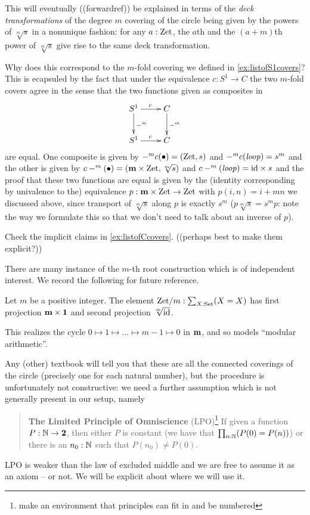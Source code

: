 \begin{example}
This will eventually ((forwardref)) be explained in terms of the \emph{deck transformations} of the degree $m$ covering of the circle being given by the powers of $\sqrt[m]s$ in a nonunique fashion: for any $a:\mathrm{Zet}$, the $a$th and the $(a+m)$th power of $\sqrt[m]s$ give rise to the same deck transformation.


Why does this correspond to the $m$-fold covering we defined in \cref{ex:listofS1covers}?  This is ecapsuled by the fact that under the equivalence $c:S^1\to C$ the two $m$-fold covers agree in the sense that the two functions given as composites in
$$\xymatrix{S^1\ar[r]^c\ar[d]^{-^m}&C\ar[d]^{-^m}\\S^1\ar[r]^c&C}$$ are equal.  One composite is given by $-^mc(\bullet)=(\mathrm{Zet},s)$ and $-^mc(\mathit{loop})=s^m$ and the other is given by $c-^m(\bullet)=(\mathbf{m}\times\mathrm{Zet},\sqrt[m]s)$ and $c-^m(\mathit{loop})=\mathord{\mathrm{id}}\times s$ and the proof that these two functions are equal is given by the (identity corresponding by univalence to the) equivalence  $p:\mathbf{m}\times \mathrm{Zet}\to\mathrm{Zet}$ with $p(i,n)=i+mn$ we discussed above, since transport of $\sqrt[m]s$ along $p$ is exactly $s^m$ (\ie $p\sqrt[m]s=s^mp$: note the way we formulate this so that we don't need to talk about an inverse of $p$).
\end{example}
\begin{xca}
  Check the implicit claims in \cref{ex:listofCcovers}.  ((perhaps best to make them explicit?))
\end{xca}
There are many instance of the $m$-th root construction which is of independent interest.  We record the following for future reference.
\begin{definition}
  \label{def:Zetmodm}
  Let $m$ be a positive integer.
  The element $\mathrm{Zet}/m:\sum_{X:\mathord{\mathrm{Set}}}(X=X)$ has first projection $\mathbf{m}\times\mathbf{1}$ and second projection $\sqrt[m]{\mathord{\mathrm{id}}}$.
\end{definition}
This realizes the cycle $0\mapsto1\mapsto\dots\mapsto m-1\mapsto 0$ in $\mathbf{m}$, and so models ``modular arithmetic''.


Any (other) textbook will tell you that these are all the connected coverings of the circle (precisely one for each natural number), but the procedure is unfortunately not constructive: we need a further assumption which is not generally present in our setup, namely

\begin{quote}
  {\bf The Limited Principle of Omniscience} (LPO)\label{LPO}\footnote{make an environment that principles can fit in and be numbered} If given a function $P:\mathbb{N}\to\mathbf{2}$, then either $P$ is constant (we have that $\prod_{n:\mathbb{N}}(P(0)=P(n))$) or there is an $n_0:\mathbb{N}$ such that $P(n_0)\neq P(0)$.
\end{quote}
LPO is weaker than the law of excluded middle and we are free to assume it as an axiom -- or not.  We will be explicit about where we will use it.


